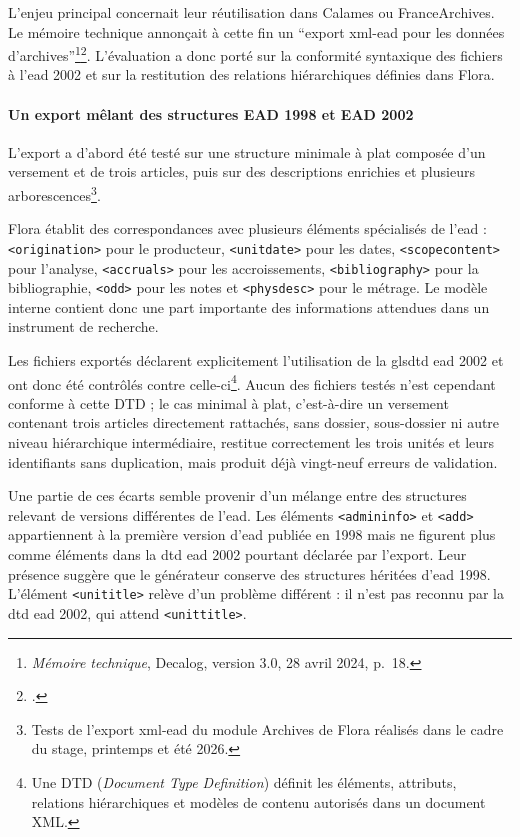 L'enjeu principal concernait leur réutilisation dans Calames ou FranceArchives. Le mémoire technique annonçait à cette fin un \enquote{export \gls{xml}-\gls{ead} pour les données d'archives}\footnote{\emph{Mémoire technique}, Decalog, version 3.0, 28 avril 2024, p.~18.}\footcite{Sibille2012}. L'évaluation a donc porté sur la conformité syntaxique des fichiers à l'\gls{ead} 2002 et sur la restitution des relations hiérarchiques définies dans Flora.

\paragraph{Un export mêlant des structures EAD 1998 et EAD 2002}

L'export a d'abord été testé sur une structure minimale à plat composée d'un versement et de trois articles, puis sur des descriptions enrichies et plusieurs arborescences\footnote{Tests de l'export \gls{xml}-\gls{ead} du module Archives de Flora réalisés dans le cadre du stage, printemps et été 2026.}.

Flora établit des correspondances avec plusieurs éléments spécialisés de l'\gls{ead} : \texttt{<origination>} pour le producteur, \texttt{<unitdate>} pour les dates, \texttt{<scopecontent>} pour l'analyse, \texttt{<accruals>} pour les accroissements, \texttt{<bibliography>} pour la bibliographie, \texttt{<odd>} pour les notes et \texttt{<physdesc>} pour le métrage. Le modèle interne contient donc une part importante des informations attendues dans un instrument de recherche.

Les fichiers exportés déclarent explicitement l'utilisation de la gls{dtd} \gls{ead} 2002 et ont donc été contrôlés contre celle-ci\footnote{Une DTD (\emph{Document Type Definition}) définit les éléments, attributs, relations hiérarchiques et modèles de contenu autorisés dans un document XML.}. Aucun des fichiers testés n'est cependant conforme à cette DTD ; le cas minimal à plat, c'est-à-dire un versement contenant trois articles directement rattachés, sans dossier, sous-dossier ni autre niveau hiérarchique intermédiaire, restitue correctement les trois unités et leurs identifiants sans duplication, mais produit déjà vingt-neuf erreurs de validation.

Une partie de ces écarts semble provenir d'un mélange entre des structures relevant de versions différentes de l'\gls{ead}. Les éléments \texttt{<admininfo>} et \texttt{<add>} appartiennent à la première version d'\gls{ead} publiée en 1998 mais ne figurent plus comme éléments dans la \gls{dtd} \gls{ead} 2002 pourtant déclarée par l'export. Leur présence suggère que le générateur conserve des structures héritées d'\gls{ead} 1998. L'élément \texttt{<unititle>} relève d'un problème différent : il n'est pas reconnu par la \gls{dtd} \gls{ead} 2002, qui attend \texttt{<unittitle>}.

